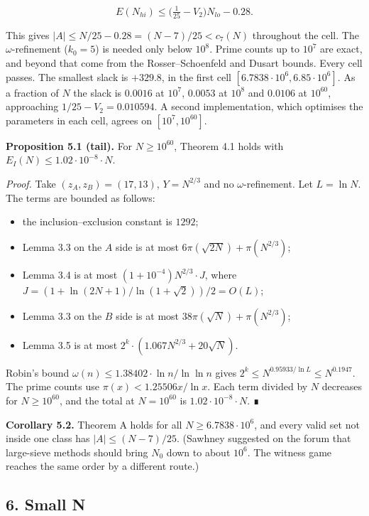 \documentclass[
  11pt,
]{article}
\providecommand{\tightlist}{%
  \setlength{\itemsep}{0pt}\setlength{\parskip}{0pt}}
\begin{document}
\[E(N_{hi}) \le \big(\tfrac1{25}-V_2\big)N_{lo} - 0.28 .\]

This gives \(|A| \le N/25 - 0.28 = (N - 7)/25 < c_7(N)\) throughout the
cell. The \(\omega\)-refinement (\(k_0 = 5\)) is needed only below
\(10^{8}\). Prime counts up to \(10^{7}\) are exact, and beyond that
come from the Rosser--Schoenfeld and Dusart bounds. Every cell passes.
The smallest slack is \(+329.8\), in the first cell
\([6.7838\cdot 10^{6}, 6.85\cdot 10^{6}]\). As a fraction of \(N\) the
slack is \(0.0016\) at \(10^{7}\), \(0.0053\) at \(10^{8}\) and
\(0.0106\) at \(10^{60}\), approaching \(1/25 - V_2 = 0.010594\). A
second implementation, which optimises the parameters in each cell,
agrees on \([10^{7}, 10^{60}]\).

\textbf{Proposition 5.1 (tail).} For \(N \ge 10^{60}\), Theorem 4.1
holds with \(E_I(N) \le 1.02\cdot 10^{-8}\cdot N\).

\emph{Proof.} Take \((z_A, z_B) = (17, 13)\), \(Y = N^{2/3}\) and no
\(\omega\)-refinement. Let \(L = \ln N\). The terms are bounded as
follows:

\begin{itemize}
\tightlist
\item
  the inclusion--exclusion constant is \(1292\);
\item
  Lemma 3.3 on the \(A\) side is at most
  \(6\pi(\sqrt{2N}) + \pi(N^{2/3})\);
\item
  Lemma 3.4 is at most \((1 + 10^{-4})N^{2/3}\cdot J\), where
  \(J = (1 + \ln(2N+1)/\ln(1+\sqrt{2}))/2 = O(L)\);
\item
  Lemma 3.3 on the \(B\) side is at most
  \(38\pi(\sqrt{N}) + \pi(N^{2/3})\);
\item
  Lemma 3.5 is at most \(2^k\cdot(1.067N^{2/3} + 20\sqrt{N})\).
\end{itemize}

Robin's bound \(\omega(n) \le 1.38402\cdot\ln n/\ln\ln n\) gives
\(2^k \le N^{0.95933/\ln L} \le N^{0.1947}\). The prime counts use
\(\pi(x) < 1.25506x/\ln x\). Each term divided by \(N\) decreases for
\(N \ge 10^{60}\), and the total at \(N = 10^{60}\) is
\(1.02\cdot 10^{-8}\cdot N\). ∎

\textbf{Corollary 5.2.} Theorem A holds for all
\(N \ge 6.7838\cdot 10^{6}\), and every valid set not inside one class
has \(|A| \le (N - 7)/25\). (Sawhney suggested on the forum that
large-sieve methods should bring \(N_0\) down to about \(10^{6}\). The
witness game reaches the same order by a different route.)

\subsection{6. Small N}
\end{document}
